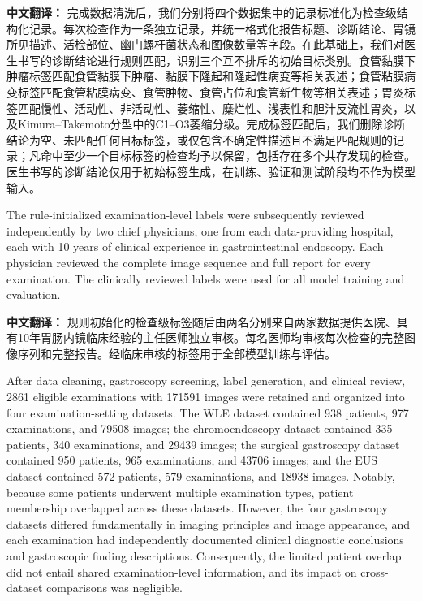\documentclass[Afour,sagev,times]{sagej}
\begin{document}
\textbf{中文翻译：} 完成数据清洗后，我们分别将四个数据集中的记录标准化为检查级结构化记录。每次检查作为一条独立记录，并统一格式化报告标题、诊断结论、胃镜所见描述、活检部位、幽门螺杆菌状态和图像数量等字段。在此基础上，我们对医生书写的诊断结论进行规则匹配，识别三个互不排斥的初始目标类别。食管黏膜下肿瘤标签匹配食管黏膜下肿瘤、黏膜下隆起和隆起性病变等相关表述；食管粘膜病变标签匹配食管粘膜病变、食管肿物、食管占位和食管新生物等相关表述；胃炎标签匹配慢性、活动性、非活动性、萎缩性、糜烂性、浅表性和胆汁反流性胃炎，以及Kimura--Takemoto分型中的C1--O3萎缩分级。完成标签匹配后，我们删除诊断结论为空、未匹配任何目标标签，或仅包含不确定性描述且不满足匹配规则的记录；凡命中至少一个目标标签的检查均予以保留，包括存在多个共存发现的检查。医生书写的诊断结论仅用于初始标签生成，在训练、验证和测试阶段均不作为模型输入。

The rule-initialized examination-level labels were subsequently reviewed independently by two chief physicians, one from each data-providing hospital, each with 10 years of clinical experience in gastrointestinal endoscopy. Each physician reviewed the complete image sequence and full report for every examination. The clinically reviewed labels were used for all model training and evaluation.

\textbf{中文翻译：} 规则初始化的检查级标签随后由两名分别来自两家数据提供医院、具有10年胃肠内镜临床经验的主任医师独立审核。每名医师均审核每次检查的完整图像序列和完整报告。经临床审核的标签用于全部模型训练与评估。

After data cleaning, gastroscopy screening, label generation, and clinical review, 2861 eligible examinations with 171591 images were retained and organized into four examination-setting datasets. The WLE dataset contained 938 patients, 977 examinations, and 79508 images; the chromoendoscopy dataset contained 335 patients, 340 examinations, and 29439 images; the surgical gastroscopy dataset contained 950 patients, 965 examinations, and 43706 images; and the EUS dataset contained 572 patients, 579 examinations, and 18938 images. Notably, because some patients underwent multiple examination types, patient membership overlapped across these datasets. However, the four gastroscopy datasets differed fundamentally in imaging principles and image appearance, and each examination had independently documented clinical diagnostic conclusions and gastroscopic finding descriptions. Consequently, the limited patient overlap did not entail shared examination-level information, and its impact on cross-dataset comparisons was negligible.
\end{document}
